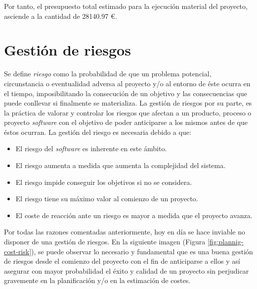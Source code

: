 \documentclass[12pt,a4paper, twoside]{report}
\begin{document}
	Por tanto, el presupuesto total estimado para la ejecución material del proyecto, asciende a la cantidad de {28140.97 \euro}.
	
	\section{Gestión de riesgos}
	
	Se define \textit{riesgo} como la probabilidad de que un problema potencial, circunstancia o eventualidad adversa al proyecto y/o al entorno de éste ocurra en el tiempo, imposibilitando la consecución de un objetivo y las consecuencias que puede conllevar si finalmente se materializa. La gestión de riesgos \cite{incibe:GR} por su parte, es la práctica de valorar y controlar los riesgos que afectan a un producto, proceso o proyecto \textit{software} con el objetivo de poder anticiparse a los mismos antes de que éstos ocurran. La gestión del riesgo es necesaria debido a que:
	
	\begin{itemize}
		\item El riesgo del \textit{software} es inherente en este ámbito.
		\item El riesgo aumenta a medida que aumenta la complejidad del sistema.
		\item El riesgo impide conseguir los objetivos si no se considera.
		\item El riesgo tiene su máximo valor al comienzo de un proyecto.
		\item El coste de reacción ante un riesgo es mayor a medida que el proyecto avanza.
	\end{itemize}
	
	Por todas las razones comentadas anteriormente, hoy en día se hace inviable no disponer de una gestión de riesgos. En la siguiente imagen (Figura \ref{fig:plannig-cost-risk}), se puede observar lo necesario y fundamental que es una buena gestión de riesgos desde el comienzo del proyecto con el fin de anticiparse a ellos y así asegurar con mayor probabilidad el éxito y calidad de un proyecto sin perjudicar gravemente en la planificación y/o en la estimación de costes. \\
\end{document}
